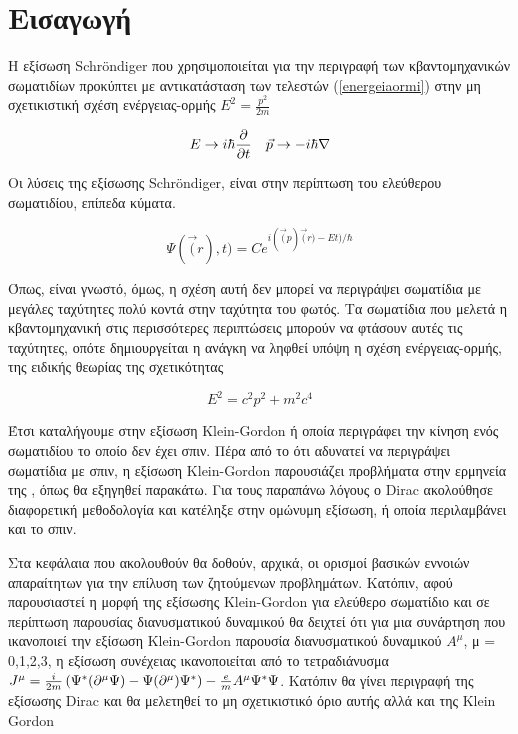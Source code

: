 \section{Εισαγωγή}

Η εξίσωση \textlatin{Schr\"ondiger} που χρησιμοποιείται για  την περιγραφή των κβαντομηχανικών σωματιδίων προκύπτει με αντικατάσταση των τελεστών (\ref{energeiaormi}) στην μη σχετικιστική σχέση ενέργειας-ορμής $E^2=\frac{p^2}{2m}$  

\begin{align} 
  E & \rightarrow i\hbar \frac{\partial }{\partial t}  &\vec{p} \rightarrow -i \hbar \nabla
  \label{energeiaormi}
\end{align} 

Οι λύσεις της εξίσωσης \textlatin{Schr\"ondiger}, είναι στην περίπτωση του ελεύθερου σωματιδίου, επίπεδα κύματα.

\[
  \Psi(\vec(r),t)=C e^{i(\vec(p)\vec(r)-Et)/\hbar}
\]

Όπως, είναι γνωστό, όμως, η σχέση αυτή δεν μπορεί να περιγράψει σωματίδια με μεγάλες ταχύτητες πολύ κοντά στην ταχύτητα του φωτός. Τα σωματίδια που μελετά η κβαντομηχανική στις περισσότερες περιπτώσεις μπορούν να φτάσουν αυτές τις ταχύτητες, οπότε δημιουργείται η ανάγκη να ληφθεί υπόψη η σχέση ενέργειας-ορμής, της ειδικής θεωρίας της σχετικότητας 

\begin{equation}
  E^2=c^2p^2+m^2c^4
  \label{genrel}
\end{equation} 

Έτσι καταλήγουμε στην εξίσωση \textlatin{Klein-Gordon} ή οποία περιγράφει την κίνηση ενός σωματιδίου το οποίο δεν έχει σπιν. Πέρα από το ότι αδυνατεί να περιγράψει σωματίδια με σπιν, η εξίσωση \textlatin{Klein-Gordon} παρουσιάζει προβλήματα στην ερμηνεία της , όπως θα εξηγηθεί παρακάτω. Για τους παραπάνω λόγους ο \textlatin{Dirac} ακολούθησε διαφορετική μεθοδολογία και κατέληξε στην ομώνυμη εξίσωση, ή οποία περιλαμβάνει και το σπιν. 


Στα κεφάλαια που ακολουθούν θα δοθούν, αρχικά, οι ορισμοί βασικών εννοιών απαραίτητων για την επίλυση των ζητούμενων προβλημάτων.
Κατόπιν, αφού παρουσιαστεί η μορφή της εξίσωσης \textlatin{Klein-Gordon} για ελεύθερο σωματίδιο και σε περίπτωση παρουσίας διανυσματικού δυναμικού θα δειχτεί ότι για μια συνάρτηση που ικανοποιεί την εξίσωση \textlatin{Klein-Gordon} παρουσία διανυσματικού δυναμικού $A^\mu$, μ = 0,1,2,3, η εξίσωση συνέχειας ικανοποιείται από το τετραδιάνυσμα $J^\mu =\frac{i}{2m} \left(  \Psi^* (\partial^\mu \Psi)-\Psi(\partial^\mu)\Psi^* \right)  - \frac{e}{m}A^\mu \Psi^* \Psi$.
Κατόπιν θα γίνει περιγραφή της εξίσωσης \textlatin{Dirac} και θα μελετηθεί το μη σχετικιστικό όριο αυτής αλλά και της \textlatin{Klein Gordon}

